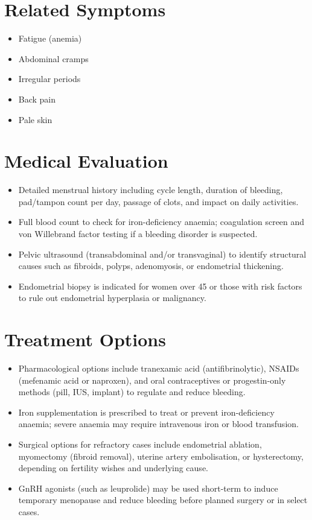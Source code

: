 \section*{Related Symptoms}
\begin{itemize}
  \item Fatigue (anemia)
  \item Abdominal cramps
  \item Irregular periods
  \item Back pain
  \item Pale skin
\end{itemize}

\section*{Medical Evaluation}
\begin{itemize}
  \item Detailed menstrual history including cycle length, duration of bleeding, pad/tampon count per day, passage of clots, and impact on daily activities.
  \item Full blood count to check for iron-deficiency anaemia; coagulation screen and von Willebrand factor testing if a bleeding disorder is suspected.
  \item Pelvic ultrasound (transabdominal and/or transvaginal) to identify structural causes such as fibroids, polyps, adenomyosis, or endometrial thickening.
  \item Endometrial biopsy is indicated for women over 45 or those with risk factors to rule out endometrial hyperplasia or malignancy.
\end{itemize}

\section*{Treatment Options}
\begin{itemize}
  \item Pharmacological options include tranexamic acid (antifibrinolytic), NSAIDs (mefenamic acid or naproxen), and oral contraceptives or progestin-only methods (pill, IUS, implant) to regulate and reduce bleeding.
  \item Iron supplementation is prescribed to treat or prevent iron-deficiency anaemia; severe anaemia may require intravenous iron or blood transfusion.
  \item Surgical options for refractory cases include endometrial ablation, myomectomy (fibroid removal), uterine artery embolisation, or hysterectomy, depending on fertility wishes and underlying cause.
  \item GnRH agonists (such as leuprolide) may be used short-term to induce temporary menopause and reduce bleeding before planned surgery or in select cases.
\end{itemize}

